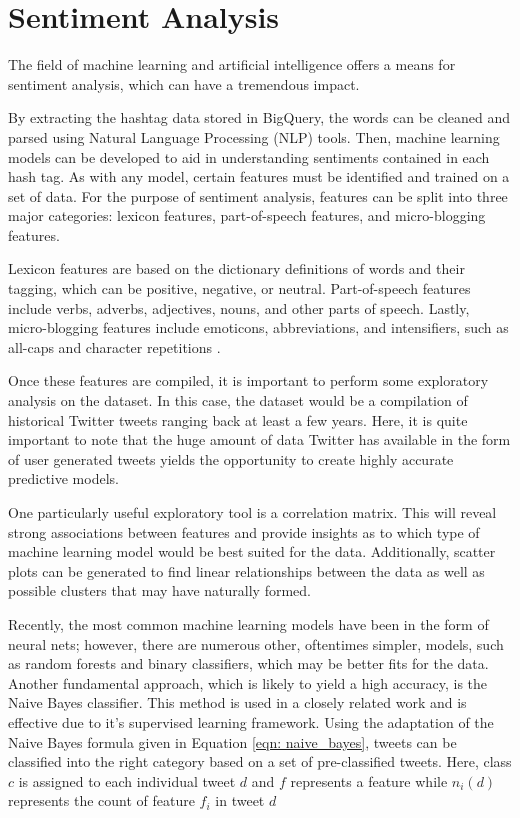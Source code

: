 \documentclass[conference]{IEEEtran}
\begin{document}
\section{Sentiment Analysis}
The field of machine learning and artificial intelligence offers a means for sentiment analysis, which can have a tremendous impact. \par

By extracting the hashtag data stored in BigQuery, the words can be cleaned and parsed using Natural Language Processing (NLP) tools. Then, machine learning models can be developed to aid in understanding sentiments contained in each hash tag. As with any model, certain features must be identified and trained on a set of data. For the purpose of sentiment analysis, features can be split into three major categories: lexicon features, part-of-speech features, and micro-blogging features. \par

Lexicon features are based on the dictionary definitions of words and their tagging, which can be positive, negative, or neutral. Part-of-speech features include verbs, adverbs, adjectives, nouns, and other parts of speech. Lastly, micro-blogging features include emoticons, abbreviations, and intensifiers, such as all-caps and character repetitions \cite{sentiment_kouloumpis}.

Once these features are compiled, it is important to perform some exploratory analysis on the dataset. In this case, the dataset would be a compilation of historical Twitter tweets ranging back at least a few years. Here, it is quite important to note that the huge amount of data Twitter has available in the form of user generated tweets yields the opportunity to create highly accurate predictive models. \par

One particularly useful exploratory tool is a correlation matrix. This will reveal strong associations between features and provide insights as to which type of machine learning model would be best suited for the data. Additionally, scatter plots can be generated to find linear relationships between the data as well as possible clusters that may have naturally formed. \par

Recently, the most common machine learning models have been in the form of neural nets; however, there are numerous other, oftentimes simpler, models, such as random forests and binary classifiers, which may be better fits for the data. Another fundamental approach, which is likely to yield a high accuracy, is the Naive Bayes classifier. This method is used in a closely related work and is effective due to it's supervised learning framework. Using the adaptation of the Naive Bayes formula given in Equation \ref{eqn: naive_bayes}, tweets can be classified into the right category based on a set of pre-classified tweets. Here, class $c$ is assigned to each individual tweet $d$ and $f$ represents a feature while $n_i(d)$ represents the count of feature $f_i$ in tweet $d$ \cite{6897213} \par
\end{document}

